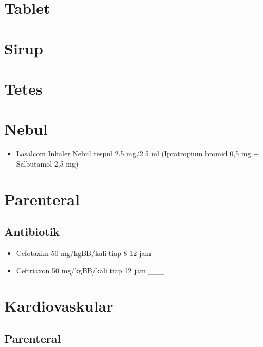 \documentclass[
]{book}
\providecommand{\tightlist}{%
  \setlength{\itemsep}{0pt}\setlength{\parskip}{0pt}}
\begin{document}
\hypertarget{tablet}{%
\section{Tablet}\label{tablet}}

\hypertarget{sirup}{%
\section{Sirup}\label{sirup}}

\hypertarget{tetes}{%
\section{Tetes}\label{tetes}}

\hypertarget{nebul}{%
\section{Nebul}\label{nebul}}

\begin{itemize}
\tightlist
\item
  Lasalcom Inhaler Nebul respul 2.5 mg/2.5 ml (Ipratropium bromid 0,5 mg + Salbutamol 2,5 mg)
\end{itemize}

\hypertarget{parenteral-2}{%
\section{Parenteral}\label{parenteral-2}}

\hypertarget{antibiotik}{%
\subsection{Antibiotik}\label{antibiotik}}

\begin{itemize}
\tightlist
\item
  Cefotaxim 50 mg/kgBB/kali tiap 8-12 jam
\item
  Ceftriaxon 50 mg/kgBB/kali tiap 12 jam
  \_\_\_
\end{itemize}

\hypertarget{kardiovaskular-3}{%
\section{Kardiovaskular}\label{kardiovaskular-3}}

\hypertarget{parenteral-3}{%
\subsection{Parenteral}\label{parenteral-3}}
\end{document}
